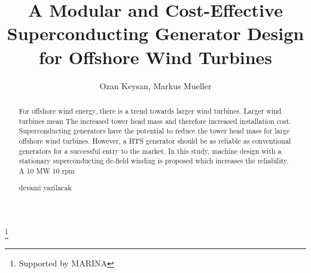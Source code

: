 \documentclass[12pt]{iopart}
\begin{document}
\title[]{A Modular and Cost-Effective Superconducting Generator Design for Offshore Wind Turbines}
\footnote{Supported by MARINA}
\author{Ozan Keysan, Markus Mueller}

\address{Institute for Energy Systems,
University of Edinburgh, 
EH93JL, UK}

\begin{abstract}
For offshore wind energy, there is a trend  towards larger wind turbines. Larger wind turbines mean The increased tower head mass and therefore increased installation cost. Superconducting generators have the potential to reduce the tower head mass for large offshore wind turbines. However,  a HTS generator should be as reliable as conventional generators for a successful entry to the market. In this study, machine design with a stationary superconducting dc-field winding is proposed which increases the reliability. A 10 MW 10 rpm 

devami yazilacak 


\end{abstract}
\end{document}
